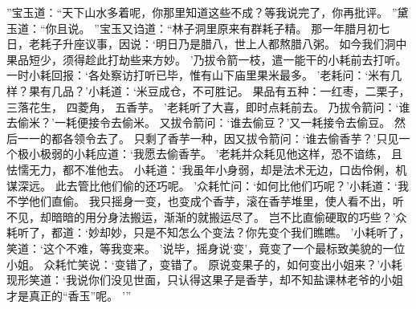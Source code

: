 ”宝玉道：“天下山水多着呢，你那里知道这些不成？等我说完了，你再批评。
”黛玉道：“你且说。
”宝玉又诌道：“林子洞里原来有群耗子精。
那一年腊月初七日，老耗子升座议事，因说：‘明日乃是腊八，世上人都熬腊八粥。
如今我们洞中果品短少，须得趁此打劫些来方妙。
’乃拔令箭一枝，遣一能干的小耗前去打听。
一时小耗回报：‘各处察访打听已毕，惟有山下庙里果米最多。
’老耗问：‘米有几样？果有几品？’小耗道：‘米豆成仓，不可胜记。
果品有五种：一红枣，二栗子，三落花生，
四菱角，
五香芋。
’老耗听了大喜，即时点耗前去。
乃拔令箭问：‘谁去偷米？’一耗便接令去偷米。
又拔令箭问：‘谁去偷豆？’又一耗接令去偷豆。
然后一一的都各领令去了。
只剩了香芋一种，因又拔令箭问：‘谁去偷香芋？’只见一个极小极弱的小耗应道：‘我愿去偷香芋。
’老耗并众耗见他这样，恐不谙练，
且怯懦无力，都不准他去。
小耗道：‘我虽年小身弱，却是法术无边，口齿伶俐，机谋深远。
此去管比他们偷的还巧呢。
’众耗忙问：‘如何比他们巧呢？’小耗道：‘我不学他们直偷。
我只摇身一变，也变成个香芋，滚在香芋堆里，使人看不出，听不见，却暗暗的用分身法搬运，渐渐的就搬运尽了。
岂不比直偷硬取的巧些？’众耗听了，都道：‘妙却妙，只是不知怎么个变法？你先变个我们瞧瞧。
’小耗听了，笑道：‘这个不难，等我变来。
’说毕，摇身说‘变’，竟变了一个最标致美貌的一位小姐。
众耗忙笑说：‘变错了，变错了。
原说变果子的，如何变出小姐来？’小耗现形笑道：‘我说你们没见世面，只认得这果子是香芋，却不知盐课林老爷的小姐才是真正的“香玉”呢。
’”\par
